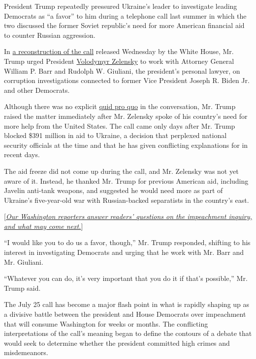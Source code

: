 President Trump repeatedly pressured Ukraine's leader to investigate
leading Democrats as ``a favor'' to him during a telephone call last
summer in which the two discussed the former Soviet republic's need for
more American financial aid to counter Russian aggression.

In
\href{https://www.nytimes.com/interactive/2019/09/25/us/politics/trump-ukraine-transcript.html?module=inline}{a
reconstruction of the call} released Wednesday by the White House, Mr.
Trump urged President
\href{https://www.nytimes.com/2019/09/25/world/europe/ukraine-trump-whistleblower-zelensky.html?module=inline}{Volodymyr
Zelensky} to work with Attorney General William P. Barr and Rudolph W.
Giuliani, the president's personal lawyer, on corruption investigations
connected to former Vice President Joseph R. Biden Jr. and other
Democrats.

Although there was no explicit
\href{https://www.nytimes.com/2019/10/18/us/politics/quid-pro-quo-mean.html}{quid
pro quo} in the conversation, Mr. Trump raised the matter immediately
after Mr. Zelensky spoke of his country's need for more help from the
United States. The call came only days after Mr. Trump blocked \$391
million in aid to Ukraine, a decision that perplexed national security
officials at the time and that he has given conflicting explanations for
in recent days.

The aid freeze did not come up during the call, and Mr. Zelensky was not
yet aware of it. Instead, he thanked Mr. Trump for previous American
aid, including Javelin anti-tank weapons, and suggested he would need
more as part of Ukraine's five-year-old war with Russian-backed
separatists in the country's east.

{[}\href{https://www.nytimes.com/2019/09/25/us/politics/donald-trump-impeachment-probe.html}{\emph{Our
Washington reporters answer readers' questions on the impeachment
inquiry, and what may come next.}}{]}

``I would like you to do us a favor, though,'' Mr. Trump responded,
shifting to his interest in investigating Democrats and urging that he
work with Mr. Barr and Mr. Giuliani.

``Whatever you can do, it's very important that you do it if that's
possible,'' Mr. Trump said.

The July 25 call has become a major flash point in what is rapidly
shaping up as a divisive battle between the president and House
Democrats over impeachment that will consume Washington for weeks or
months. The conflicting interpretations of the call's meaning began to
define the contours of a debate that would seek to determine whether the
president committed high crimes and misdemeanors.

